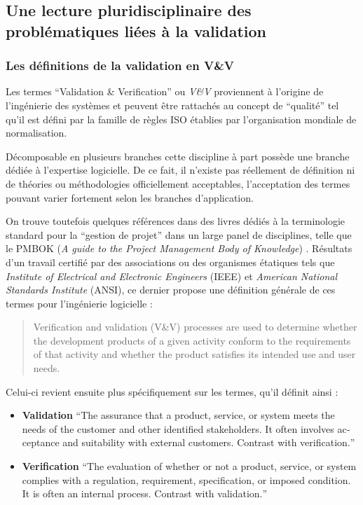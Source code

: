 

\subsection{Une lecture pluridisciplinaire des problématiques liées à la validation}
\label{ssec:triple_lecture}

\subsubsection{Les définitions de la validation en V\&V}
\label{sssec:def_generique_validation}

Les termes \foreignquote{english}{Validation \& Verification} ou \textit{V\&V} proviennent à l'origine de l'ingénierie des systèmes et peuvent être rattachés au concept de \enquote{qualité} tel qu'il est défini par la famille de règles ISO établies par l'organisation mondiale de normalisation.

Décomposable en plusieurs branches cette discipline à part possède une branche dédiée à l'expertise logicielle. De ce fait, il n'existe pas réellement de définition ni de théories ou méthodologies officiellement acceptables, l'acceptation des termes pouvant varier fortement selon les branches d'application.

On trouve toutefois quelques références dans des livres dédiés à la terminologie standard pour la \enquote{gestion de projet} dans un large panel de disciplines, telle que le PMBOK (\textit{A guide to the Project Management Body of Knowledge}) \autocite{PMBOK2013}. Résultats d'un travail certifié par des associations ou des organismes étatiques tels que \textit{Institute of Electrical and Electronic Engineers} (IEEE) et \textit{American National Standards Institute} (ANSI), ce dernier propose une définition générale de ces termes pour l'ingénierie logicielle :

\foreignblockquote{english}[\cite{PMBOK2013}]{Verification and validation (V\&V) processes are used to determine whether the development products of a given activity conform to the requirements of that activity and whether the product satisfies its intended use and user needs.}

Celui-ci revient ensuite plus spécifiquement sur les termes, qu'il définit ainsi :

\begin{itemize}
\item \textbf{Validation} \foreignquote{english}{The assurance that a product, service, or system meets the needs of the customer and other identified stakeholders. It often involves acceptance and suitability with external customers. Contrast with verification.}
\item \textbf{Verification} \foreignquote{english}{The evaluation of whether or not a product, service, or system complies with a regulation, requirement, specification, or imposed condition. It is often an internal process. Contrast with validation.}
\end{itemize}

